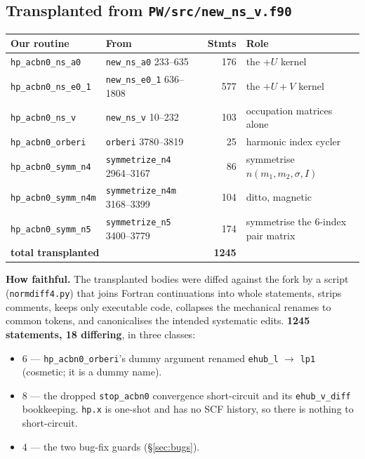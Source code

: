 \documentclass[11pt,a4paper]{article}
\newcommand{\C}[1]{\texttt{\small #1}}
\begin{document}
\subsection{Transplanted from \texttt{PW/src/new\_ns\_v.f90}}

\begin{center}\small
\begin{tabular}{llrl}
\toprule
Our routine & From & Stmts & Role \\
\midrule
\C{hp_acbn0_ns_a0}    & \C{new_ns_a0} 233--635        & 176 & the $+U$ kernel \\
\C{hp_acbn0_ns_e0_1}  & \C{new_ns_e0_1} 636--1808     & 577 & the $+U+V$ kernel \\
\C{hp_acbn0_ns_v}     & \C{new_ns_v} 10--232          & 103 & occupation matrices alone \\
\C{hp_acbn0_orberi}   & \C{orberi} 3780--3819         &  25 & harmonic index cycler \\
\C{hp_acbn0_symm_n4}  & \C{symmetrize_n4} 2964--3167  &  86 & symmetrise $n(m_1,m_2,\sigma,I)$ \\
\C{hp_acbn0_symm_n4m} & \C{symmetrize_n4m} 3168--3399 & 104 & ditto, magnetic \\
\C{hp_acbn0_symm_n5}  & \C{symmetrize_n5} 3400--3779  & 174 & symmetrise the 6-index pair matrix \\
\midrule
\multicolumn{2}{l}{\textbf{total transplanted}} & \textbf{1245} & \\
\bottomrule
\end{tabular}
\end{center}

\noindent
\textbf{How faithful.} The transplanted bodies were diffed against the fork by a
script (\C{normdiff4.py}) that joins Fortran continuations into whole
statements, strips comments, keeps only executable code, collapses the
mechanical renames to common tokens, and canonicalises the intended systematic
edits. \textbf{1245 statements, 18 differing}, in three classes:

\begin{itemize}[leftmargin=1.3em,itemsep=2pt,topsep=3pt]
\item 6 --- \C{hp_acbn0_orberi}'s dummy argument renamed \C{ehub_l}
      $\rightarrow$ \C{lp1} (cosmetic; it is a dummy name).
\item 8 --- the dropped \C{stop_acbn0} convergence short-circuit and its
      \C{ehub_v_diff} bookkeeping. \C{hp.x} is one-shot and has no SCF history,
      so there is nothing to short-circuit.
\item 4 --- the two bug-fix guards (\S\ref{sec:bugs}).
\end{itemize}
\end{document}
